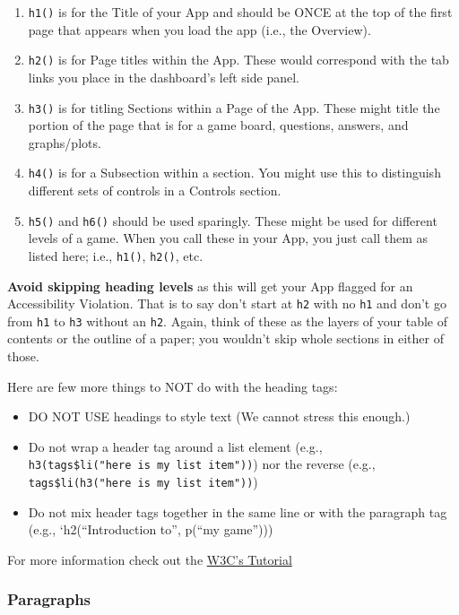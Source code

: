 \documentclass[]{book}
\providecommand{\tightlist}{%
  \setlength{\itemsep}{0pt}\setlength{\parskip}{0pt}}
\begin{document}
\begin{enumerate}
\def\labelenumi{\arabic{enumi}.}
\tightlist
\item
  \texttt{h1()} is for the Title of your App and should be ONCE at the top of the first page that appears when you load the app (i.e., the Overview).
\item
  \texttt{h2()} is for Page titles within the App. These would correspond with the tab links you place in the dashboard's left side panel.
\item
  \texttt{h3()} is for titling Sections within a Page of the App. These might title the portion of the page that is for a game board, questions, answers, and graphs/plots.
\item
  \texttt{h4()} is for a Subsection within a section. You might use this to distinguish different sets of controls in a Controls section.
\item
  \texttt{h5()} and \texttt{h6()} should be used sparingly. These might be used for different levels of a game. When you call these in your App, you just call them as listed here; i.e., \texttt{h1()}, \texttt{h2()}, etc.
\end{enumerate}

\textbf{Avoid skipping heading levels} as this will get your App flagged for an Accessibility Violation. That is to say don't start at \texttt{h2} with no \texttt{h1} and don't go from \texttt{h1} to \texttt{h3} without an \texttt{h2}. Again, think of these as the layers of your table of contents or the outline of a paper; you wouldn't skip whole sections in either of those.

Here are few more things to NOT do with the heading tags:

\begin{itemize}
\tightlist
\item
  DO NOT USE headings to style text (We cannot stress this enough.)
\item
  Do not wrap a header tag around a list element (e.g., \texttt{h3(tags\$li("here\ is\ my\ list\ item"))}) nor the reverse (e.g., \texttt{tags\$li(h3("here\ is\ my\ list\ item"))})
\item
  Do not mix header tags together in the same line or with the paragraph tag (e.g., `h2(``Introduction to'', p(``my game'')))
\end{itemize}

For more information check out the \href{https://www.w3.org/WAI/tutorials/page-structure/headings/}{W3C's Tutorial}

\hypertarget{paragraphs}{%
\subsubsection{Paragraphs}\label{paragraphs}}
\end{document}
